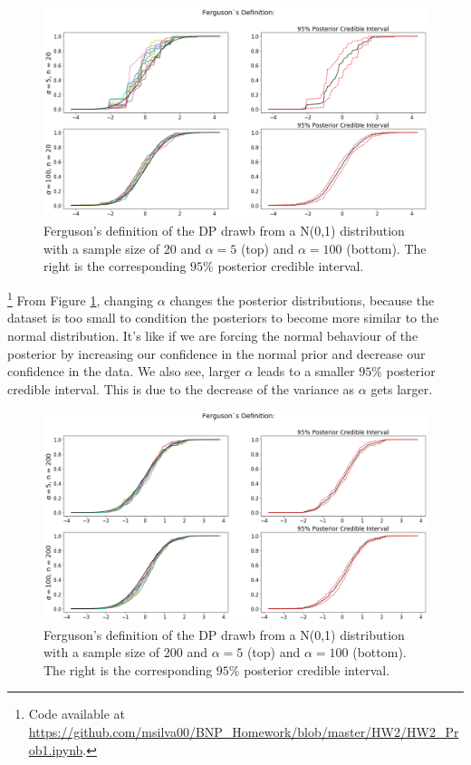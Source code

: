 \documentclass[a4paper, 10pt]{article}
\begin{document}
\begin{enumerate}
    \begin{figure}[h!]
        \centering
        \includegraphics[scale = 0.4]{hw1a_20.png}
        \caption{Ferguson's definition of the DP drawb from a N(0,1) distribution with a sample size of 20 and $\alpha = 5$ (top) and $\alpha = 100$ (bottom). The right is the corresponding $95\%$ posterior credible interval.}
        \label{1a20}
    \end{figure}
    \footnote{Code available at \url{https://github.com/msilva00/BNP_Homework/blob/master/HW2/HW2_Prob1.ipynb}.}
    \clearpage
    From Figure \ref{1a20}, changing $\alpha$ changes the posterior distributions, because the dataset is too small to condition the posteriors to become more similar to the normal distribution. It’s like if we are forcing the normal behaviour of the posterior by increasing our confidence in the normal prior and decrease our confidence in the data. We also see, larger $\alpha$ leads to a smaller $95\%$ posterior credible interval. This is due to the decrease of the variance as $\alpha$ gets larger.
    
    \begin{figure}[h!]
        \centering
        \includegraphics[scale = 0.35]{hw1a_200.png}
        \caption{Ferguson's definition of the DP drawb from a N(0,1) distribution with a sample size of 200 and $\alpha = 5$ (top) and $\alpha = 100$ (bottom). The right is the corresponding $95\%$ posterior credible interval.}
        \label{1a200}
    \end{figure}
    

\end{enumerate}
\end{document}
